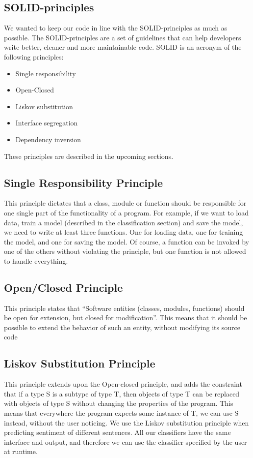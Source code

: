 \subsection{SOLID-principles}
We wanted to keep our code in line with the SOLID-principles \cite{SOLID} as much as possible. The SOLID-principles are a set of guidelines that can help developers write better, cleaner and more maintainable code.
SOLID is an acronym of the following principles:
\begin{itemize}
    \item Single responsibility
    \item Open-Closed
    \item Liskov substitution
    \item Interface segregation
    \item Dependency inversion
\end{itemize}
These principles are described in the upcoming sections.

\subsection{Single Responsibility Principle}
This principle dictates that a class, module or function should be responsible for one single part of the functionality of a program. For example, if we want to load data, train a model (described in the classification section) and save the model, we need to write at least three functions. One for loading data, one for training the model, and one for saving the model. Of course, a function can be invoked by one of the others without violating the principle, but one function is not allowed to handle everything.

\subsection{Open/Closed Principle}
This principle states that “Software entities (classes, modules, functions) should be open for extension, but closed for modification”. This means that it should be possible to extend the behavior of such an entity, without modifying its source code


\subsection{Liskov Substitution Principle}
This principle extends upon the Open-closed principle, and adds the constraint that if a type S is a subtype of type T, then objects of type T can be replaced with objects of type S without changing the properties of the program. 
This means that everywhere the program expects some instance of T, we can use S instead, without the user noticing.
We use the Liskov substitution principle when predicting sentiment of different sentences. All our classifiers have the same interface and output, and therefore we can use the classifier specified by the user at runtime.

